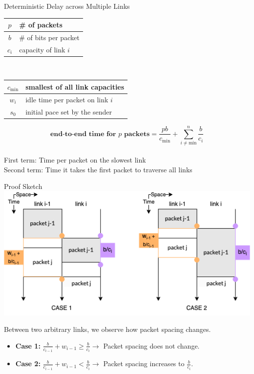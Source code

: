 \documentclass[final]{beamer}
\newlength{\colwidth}
\begin{document}
\begin{frame}[t]
\begin{columns}[t]
\begin{column}{\colwidth}
\begin{block}{Deterministic Delay across Multiple Links}
    \begin{center}
      \begin{tabular}{| c | l |}
        \hline
        $p$ & \# of packets\\
        \hline
        $b$ & \# of bits per packet\\
        \hline
        $c_i$ & capacity of link $i$\\
        \hline
      \end{tabular} \ \ \ \
      \begin{tabular}{| c | l |}
        \hline
        $c_\mathrm{min}$ & smallest of all link capacities\\
        \hline
        $w_i$ & idle time per packet on link $i$\\
        \hline
        $s_0$ & initial pace set by the sender\\
        \hline
      \end{tabular}
    \end{center}
    
    {\large
    \[\textbf{end-to-end time for $p$ packets} = \frac{pb}{c_\mathrm{min}} + \sum_{i\neq \mathrm{min}}^{n}\frac{b}{c_i}\]}\\
    First term: Time per packet on the slowest link\\
    Second term: Time it takes the first packet to traverse all links
  \end{block}
  \begin{exampleblock}{Proof Sketch}
      \includegraphics[scale=2]{Cases.png}
  
    {\Large Between two arbitrary links, we observe how packet spacing changes.
    \begin{itemize}
      \item \textbf{Case 1:} $\frac{b}{c_{i-1}} + w_{i-1} \geq \frac{b}{c_{i}} \to$ 
      Packet spacing does not change.
      \item \textbf{Case 2:} $\frac{b}{c_{i-1}} + w_{i-1} < \frac{b}{c_{i}} \to$ 
      Packet spacing increases to $\frac{b}{c_i}$.
    \end{itemize}}


\end{exampleblock}
\end{column}
\end{columns}
\end{frame}
\end{document}
